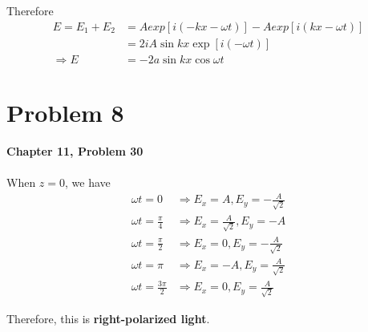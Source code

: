 \documentclass{article}
\begin{document}
Therefore
\begin{align*}
    E = E_1+E_2   & = Aexp{\left[i(-kx-\omega t)\right]}-Aexp{\left[i(kx-\omega t)\right]} \\
                  & = 2iA\sin{kx}\exp{\left[i(-\omega t)\right]}                           \\
    \Rightarrow E & = -2a\sin{kx}\cos{\omega t}
\end{align*}

\section{Problem 8}
\textbf{Chapter 11, Problem 30}\\\\

When $z=0$, we have
\begin{align*}
    \omega t = 0              & \Rightarrow E_x = A, E_y = -\frac{A}{\sqrt{2}} \\
    \omega t = \frac{\pi}{4}  & \Rightarrow E_x = \frac{A}{\sqrt{2}}, E_y = -A \\
    \omega t = \frac{\pi}{2}  & \Rightarrow E_x = 0, E_y = -\frac{A}{\sqrt{2}} \\
    \omega t = \pi            & \Rightarrow E_x = -A, E_y = \frac{A}{\sqrt{2}} \\
    \omega t = \frac{3\pi}{2} & \Rightarrow E_x = 0, E_y = \frac{A}{\sqrt{2}}
\end{align*}

Therefore, this is \textbf{right-polarized light}.
\end{document}
